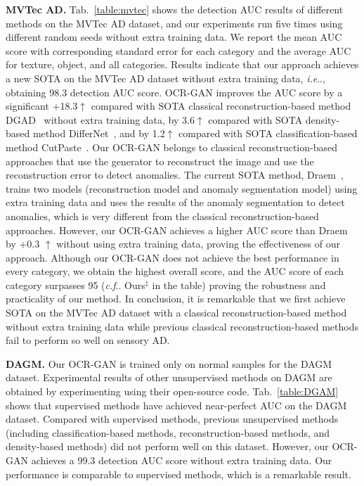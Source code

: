\documentclass[lettersize,journal]{IEEEtran}
\makeatletter
\DeclareRobustCommand\onedot{\futurelet\@let@token\@onedot}
\def\@onedot{\ifx\@let@token.\else.\null\fi\xspace}
\def\ie{\emph{i.e}\onedot} \def\Ie{\emph{I.e}\onedot}
\def\cf{\emph{c.f}\onedot} \def\Cf{\emph{C.f}\onedot}
\makeatother
\begin{document}
\noindent\textbf{MVTec AD.} Tab.~\ref{table:mvtec} shows the detection AUC results of different methods on the MVTec AD dataset, and our experiments run five times using different random seeds without extra training data. We report the mean AUC score with corresponding standard error for each category and the average AUC for texture, object, and all categories. Results indicate that our approach achieves a new SOTA on the MVTec AD dataset without extra training data, \ie, obtaining 98.3 detection AUC score.
OCR-GAN improves the AUC score by a significant +18.3$\uparrow$ compared with SOTA classical reconstruction-based method DGAD~\cite{xia2021discriminative} without extra training data, by 3.6$\uparrow$ compared with SOTA density-based method DifferNet~\cite{rudolph2021same}, and by 1.2$\uparrow$ compared with SOTA classification-based method CutPaste~\cite{li2021cutpaste}. Our OCR-GAN belongs to classical reconstruction-based approaches that use the generator to reconstruct the image and use the reconstruction error to detect anomalies. The current SOTA method, Draem~\cite{zavrtanik2021draem}, trains two models (reconstruction model and anomaly segmentation model) using extra training data and uses the results of the anomaly segmentation to detect anomalies, which is very different from the classical reconstruction-based approaches. However, our OCR-GAN achieves a higher AUC score than Draem~\cite{zavrtanik2021draem} by +0.3 $\uparrow$ without using extra training data, proving the effectiveness of our approach. Although our OCR-GAN does not achieve the best performance in every category, we obtain the highest overall score, and the AUC score of each category surpasses 95 (\cf Ours$^{\ddag}$ in the table) proving the robustness and practicality of our method. In conclusion, it is remarkable that we first achieve SOTA on the MVTec AD dataset with a classical reconstruction-based method without extra training data while previous classical reconstruction-based methods fail to perform so well on sensory AD.

\noindent\textbf{DAGM.} Our OCR-GAN is trained only on normal samples for the DAGM dataset.
Experimental results of other unsupervised methods on DAGM are obtained by experimenting using their open-source code. Tab.~\ref{table:DGAM} shows that supervised methods have achieved near-perfect AUC on the DAGM dataset. Compared with supervised methods, previous unsupervised methods (including classification-based methods, reconstruction-based methods, and density-based methods) did not perform well on this dataset. However, our OCR-GAN achieves a 99.3 detection AUC score without extra training data. Our performance is comparable to supervised methods, which is a remarkable result.
\end{document}
